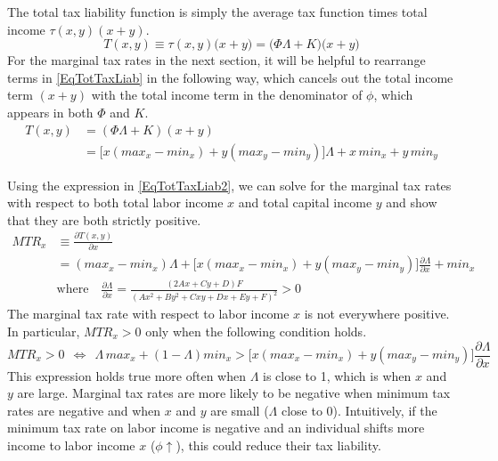 \documentclass[letterpaper,12pt]{article}
\theoremstyle{definition}
\begin{document}
\begin{spacing}{1.5}
    The total tax liability function is simply the average tax function times total income $\tau(x,y)(x+y)$.
    \begin{equation}\label{EqTotTaxLiab}
      T(x,y) \equiv \tau(x,y)\bigl(x + y\bigr) = \bigl(\Phi\Lambda + K\bigr)\bigl(x + y\bigr)
    \end{equation}
    For the marginal tax rates in the next section, it will be helpful to rearrange terms in \eqref{EqTotTaxLiab} in the following way, which cancels out the total income term $(x+y)$ with the total income term in the denominator of $\phi$, which appears in both $\Phi$ and $K$.
    \begin{equation}\label{EqTotTaxLiab2}
      \begin{split}
        T(x,y) &= (\Phi\Lambda + K)(x+y) \\
        &= \bigl[x(max_x - min_x) + y(max_y - min_y)\bigr]\Lambda + x\,min_x + y\,min_y
      \end{split}
    \end{equation}

    Using the expression in \eqref{EqTotTaxLiab2}, we can solve for the marginal tax rates with respect to both total labor income $x$ and total capital income $y$ and show that they are both strictly positive.
    \begin{equation}\label{EqMTRx}
      \begin{split}
        MTR_x &\equiv \frac{\partial T(x,y)}{\partial x} \\
        &= (max_x - min_x)\Lambda + \bigl[x(max_x - min_x) + y(max_y - min_y)\bigr]\frac{\partial\Lambda}{\partial x} + min_x \\
        &\text{where}\quad \frac{\partial\Lambda}{\partial x} = \frac{(2Ax + Cy + D)F}{(Ax^2 + By^2 + Cxy + Dx + Ey + F)^2} > 0
      \end{split}
    \end{equation}
    The marginal tax rate with respect to labor income $x$ is not everywhere positive. In particular, $MTR_x>0$ only when the following condition holds.
    \begin{equation}\label{EqMTRxpos}
      MTR_x>0 \:\:\Leftrightarrow\:\: \Lambda\,max_x + (1 - \Lambda)min_x > \bigl[x(max_x - min_x) + y(max_y - min_y)\bigr]\frac{\partial\Lambda}{\partial x}
    \end{equation}
    This expression holds true more often when $\Lambda$ is close to 1, which is when $x$ and $y$ are large. Marginal tax rates are more likely to be negative when minimum tax rates are negative and when $x$ and $y$ are small ($\Lambda$ close to 0). Intuitively, if the minimum tax rate on labor income is negative and an individual shifts more income to labor income $x$ ($\phi\uparrow$), this could reduce their tax liability.


\end{spacing}
\end{document}
